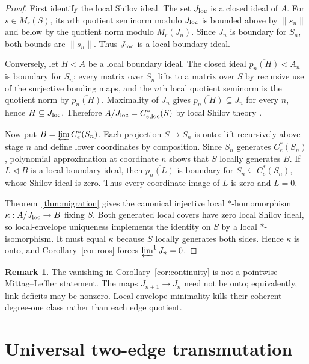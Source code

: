 \documentclass[11pt,a4paper]{amsart}
\theoremstyle{plain}
\theoremstyle{definition}
\newtheorem{remark}[theorem]{Remark}
\newcommand{\Ce}{C_e^*}
\begin{document}
\begin{proof}
First identify the local Shilov ideal.  The set \(J_{\rm loc}\) is a closed ideal of \(A\).
For \(s\in M_r(S)\), its \(n\)th quotient seminorm modulo \(J_{\rm loc}\) is bounded above by
\(\|s_n\|\) and below by the quotient norm modulo \(M_r(J_n)\).  Since \(J_n\) is boundary for
\(S_n\), both bounds are \(\|s_n\|\).  Thus \(J_{\rm loc}\) is a local boundary ideal.

Conversely, let \(H\triangleleft A\) be a local boundary ideal.  The closed ideal
\(\overline{p_n(H)}\triangleleft A_n\) is boundary for \(S_n\): every matrix over \(S_n\) lifts
to a matrix over \(S\) by recursive use of the surjective bonding maps, and the \(n\)th local
quotient seminorm is the quotient norm by \(\overline{p_n(H)}\).  Maximality of \(J_n\) gives
\(\overline{p_n(H)}\subseteq J_n\) for every \(n\), hence \(H\subseteq J_{\rm loc}\).  Therefore
\(A/J_{\rm loc}=C_{e,\mathrm{loc}}^*(S)\) by local Shilov theory
\cite[Theorems~3.16 and~3.18]{Joita2025}.

Now put \(B=\varprojlim\Ce(S_n)\).  Each projection \(S\to S_n\) is onto: lift recursively above
stage \(n\) and define lower coordinates by composition.  Since \(S_n\) generates \(\Ce(S_n)\),
polynomial approximation at coordinate \(n\) shows that \(S\) locally generates \(B\).
If \(L\triangleleft B\) is a local boundary ideal, then
\(\overline{p_n(L)}\) is boundary for \(S_n\subseteq\Ce(S_n)\), whose Shilov ideal is zero.
Thus every coordinate image of \(L\) is zero and \(L=0\).

Theorem~\ref{thm:migration} gives the canonical injective local
\(*\)-homomorphism \(\kappa:A/J_{\rm loc}\to B\) fixing \(S\).  Both generated local covers have
zero local Shilov ideal, so local-envelope uniqueness
\cite[Theorem~3.18]{Joita2025} implements the identity on \(S\) by a local
\(*\)-isomorphism.  It must equal \(\kappa\) because \(S\) locally generates both sides.
Hence \(\kappa\) is onto, and Corollary~\ref{cor:roos} forces
\(\varprojlim^1J_n=0\).
\end{proof}

\begin{remark}
The vanishing in Corollary~\ref{cor:continuity} is not a pointwise Mittag--Leffler statement.
The maps $J_{n+1}\to J_n$ need not be onto; equivalently, link deficits may be nonzero.  Local
envelope minimality kills their coherent degree-one class rather than each edge quotient.
\end{remark}

\section{Universal two-edge transmutation}\label{sec:realization}
\end{document}
